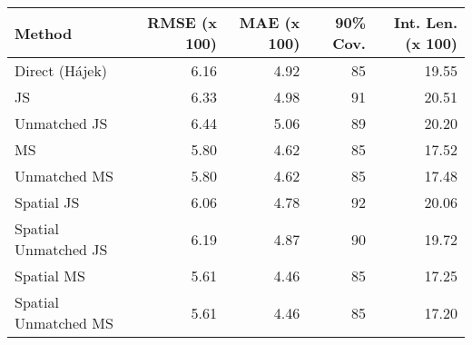 
\begin{tabular}{lrrrr}
\toprule
Method & RMSE (x 100) & MAE (x 100) & 90\% Cov. & Int. Len. (x 100)\\
\midrule
Direct (Hájek) & 6.16 & 4.92 & 85 & 19.55\\
JS & 6.33 & 4.98 & 91 & 20.51\\
Unmatched JS & 6.44 & 5.06 & 89 & 20.20\\
MS & 5.80 & 4.62 & 85 & 17.52\\
Unmatched MS & 5.80 & 4.62 & 85 & 17.48\\
Spatial JS & 6.06 & 4.78 & 92 & 20.06\\
Spatial Unmatched JS & 6.19 & 4.87 & 90 & 19.72\\
Spatial MS & 5.61 & 4.46 & 85 & 17.25\\
Spatial Unmatched MS & 5.61 & 4.46 & 85 & 17.20\\
\bottomrule
\end{tabular}
